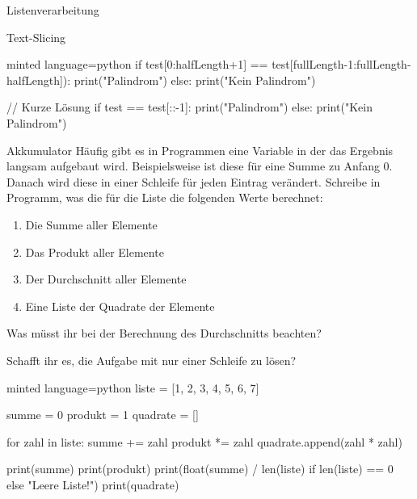 \begin{task}[points=auto]{Listenverarbeitung}
\begin{subtask*}[points=0]{Text-Slicing }
\begin{solution}
\begin{codeBlock}[]{minted language=python}
                if test[0:halfLength+1] == test[fullLength-1:fullLength-halfLength]):
                    print("Palindrom")
                else:
                    print("Kein Palindrom")

                // Kurze Lösung
                if test == test[::-1]:
                    print("Palindrom")
                else:
                    print("Kein Palindrom")
            \end{codeBlock}
        \end{solution}
    \end{subtask*}
    \begin{subtask*}[points=0]{Akkumulator }
        Häufig gibt es in Programmen eine Variable in der das Ergebnis langsam aufgebaut
        wird. Beispielsweise ist diese für eine Summe zu Anfang $0$. Danach wird diese
        in einer Schleife für jeden Eintrag verändert. Schreibe in Programm, was die
        für die Liste \pythoninline{[1, 2, 3, 4, 5, 6, 7]} die folgenden Werte berechnet:

        \begin{enumerate}
            \item Die Summe aller Elemente
            \item Das Produkt aller Elemente
            \item Der Durchschnitt aller Elemente
            \item Eine Liste der Quadrate der Elemente
        \end{enumerate}

        Was müsst ihr bei der Berechnung des Durchschnitts beachten?

        \begin{infoBox}

            Schafft ihr es, die Aufgabe mit nur einer Schleife zu lösen?
        \end{infoBox}

        \begin{solution}
            \begin{codeBlock}[]{minted language=python}
                liste = [1, 2, 3, 4, 5, 6, 7]

                summe = 0
                produkt = 1
                quadrate = []

                for zahl in liste:
                    summe += zahl
                    produkt *= zahl
                    quadrate.append(zahl * zahl)

                print(summe)
                print(produkt)
                print(float(summe) / len(liste) if len(liste) == 0 else "Leere Liste!")
                print(quadrate)
            \end{codeBlock}
        \end{solution}
    \end{subtask*}
\end{task}

